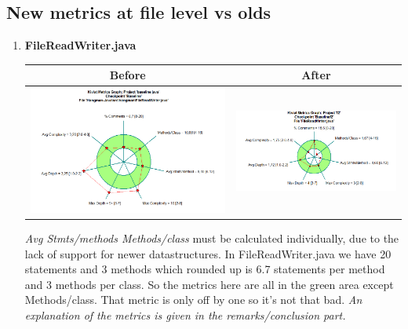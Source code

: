 \documentclass{article}
\begin{document}
\subsection{New metrics at file level vs olds} 
\begin{enumerate}
	\item
	\textbf{FileReadWriter.java\newline}
	\begin{tabulary}{0.5\textwidth}{| c | c |}
	\hline
	 Before & After \\ \hline
	\includegraphics[scale=0.3]{FileReadWriter-kiviat-before.png} & \includegraphics[scale=0.4]{Kiviat-filereadwriter-after.png} \\ \hline
	\end{tabulary}
	\newline
	\vspace{0.1cm}
	\textit{Avg Stmts/methods Methods/class} must be calculated individually, due to the lack of support for newer datastructures. In FileReadWriter.java we have 20 statements and 3 methods which  rounded up is 6.7 statements per method and 3 methods per class. So the metrics here are all in the green area except Methods/class. That metric is only off by one so it's not that bad. \textit{An explanation of the metrics is given in the remarks/conclusion part.}

\end{enumerate}
\end{document}
